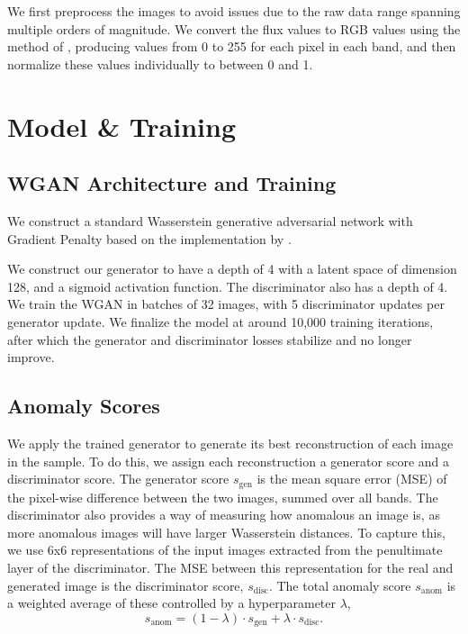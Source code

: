 \documentclass{article}
\begin{document}
We first preprocess the images to avoid issues due to the raw data range spanning multiple orders of magnitude.
We convert the flux values to RGB values using the method of \citealt{Lupton2004}, producing values from 0 to 255 for each pixel in each band, and then normalize these values individually to between 0 and 1.


\section{Model \& Training}
\label{headings}

\subsection{WGAN Architecture and Training}

We construct a standard Wasserstein generative adversarial network with Gradient Penalty based on the implementation by \cite{Gulrajani2017}.

We construct our generator to have a depth of 4 with a latent space of dimension 128, and a sigmoid activation function.
The discriminator also has a depth of 4.
We train the WGAN in batches of 32 images, with 5 discriminator updates per generator update.
We finalize the model at around 10,000 training iterations, after which the generator and discriminator losses stabilize and no longer improve.

\subsection{Anomaly Scores}

We apply the trained generator to generate its best reconstruction of each image in the sample.
To do this, we assign each  reconstruction a generator score and a discriminator score.
The generator score $s_\mathrm{gen}$ is the mean square error (MSE) of the pixel-wise difference between the two images, summed over all bands.
The discriminator also provides a way of measuring how anomalous an image is, as more anomalous images will have larger Wasserstein distances.
To capture this, we use 6x6 representations of the input images extracted from the penultimate layer of the discriminator.
The MSE between this representation for the real and generated image is the discriminator score, $s_\mathrm{disc}$.
The total anomaly score $s_\mathrm{anom}$ is a weighted average of these controlled by a hyperparameter $\lambda$,
\begin{equation}
s_\mathrm{anom} = (1-\lambda) \cdot s_\mathrm{gen} + \lambda \cdot s_\mathrm{disc}.
\end{equation}
\end{document}
